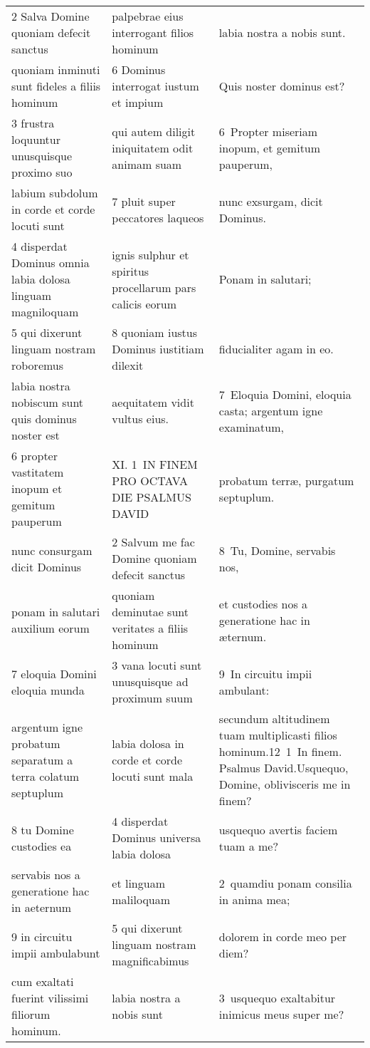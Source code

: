 \documentclass{article}
\begin{document}
\begin{longtable}{@{}p{}p{}p{}@{}}
2 Salva Domine quoniam defecit sanctus	&	palpebrae eius interrogant filios hominum	&	labia nostra a nobis sunt.	\\
quoniam inminuti sunt fideles a filiis hominum	&	6 Dominus interrogat iustum et impium	&	Quis noster dominus est?	\\
3 frustra loquuntur unusquisque proximo suo	&	qui autem diligit iniquitatem odit animam suam	&	6 Propter miseriam inopum, et gemitum pauperum,	\\
labium subdolum in corde et corde locuti sunt	&	7 pluit super peccatores laqueos	&	nunc exsurgam, dicit Dominus.	\\
4 disperdat Dominus omnia labia dolosa linguam magniloquam	&	ignis sulphur et spiritus procellarum pars calicis eorum	&	Ponam in salutari;	\\
5 qui dixerunt linguam nostram roboremus	&	8 quoniam iustus Dominus iustitiam dilexit	&	fiducialiter agam in eo.	\\
labia nostra nobiscum sunt quis dominus noster est	&	aequitatem vidit vultus eius.	&	7 Eloquia Domini, eloquia casta; argentum igne examinatum,	\\
6 propter vastitatem inopum et gemitum pauperum	&	XI. 1 IN FINEM PRO OCTAVA DIE PSALMUS DAVID	&	probatum terræ, purgatum septuplum.	\\
nunc consurgam dicit Dominus	&	2 Salvum me fac Domine quoniam defecit sanctus	&	8 Tu, Domine, servabis nos,	\\
ponam in salutari auxilium eorum	&	quoniam deminutae sunt veritates a filiis hominum	&	et custodies nos a generatione hac in æternum.	\\
7 eloquia Domini eloquia munda	&	3 vana locuti sunt unusquisque ad proximum suum	&	9 In circuitu impii ambulant:	\\
argentum igne probatum separatum a terra colatum septuplum	&	labia dolosa in corde et corde locuti sunt mala	&	secundum altitudinem tuam multiplicasti filios hominum.12 1 In finem. Psalmus David.Usquequo, Domine, oblivisceris me in finem?	\\
8 tu Domine custodies ea	&	4 disperdat Dominus universa labia dolosa	&	usquequo avertis faciem tuam a me?	\\
servabis nos a generatione hac in aeternum	&	et linguam maliloquam	&	2 quamdiu ponam consilia in anima mea;	\\
9 in circuitu impii ambulabunt	&	5 qui dixerunt linguam nostram magnificabimus	&	dolorem in corde meo per diem?	\\
cum exaltati fuerint vilissimi filiorum hominum.	&	labia nostra a nobis sunt	&	3 usquequo exaltabitur inimicus meus super me?	\\

\end{longtable}
\end{document}
